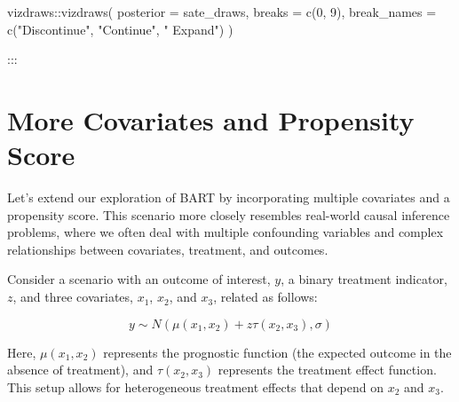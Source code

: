 \documentclass[
  letterpaper,
  DIV=11,
  numbers=noendperiod]{scrreprt}
\newenvironment{Shaded}{\begin{snugshade}}{\end{snugshade}}
\newcommand{\AttributeTok}[1]{\textcolor[rgb]{0.40,0.45,0.13}{#1}}
\newcommand{\DecValTok}[1]{\textcolor[rgb]{0.68,0.00,0.00}{#1}}
\newcommand{\FunctionTok}[1]{\textcolor[rgb]{0.28,0.35,0.67}{#1}}
\newcommand{\NormalTok}[1]{\textcolor[rgb]{0.00,0.23,0.31}{#1}}
\newcommand{\SpecialCharTok}[1]{\textcolor[rgb]{0.37,0.37,0.37}{#1}}
\newcommand{\StringTok}[1]{\textcolor[rgb]{0.13,0.47,0.30}{#1}}
\begin{document}
\begin{Shaded}
\begin{Highlighting}[]
\NormalTok{vizdraws}\SpecialCharTok{::}\FunctionTok{vizdraws}\NormalTok{(}
  \AttributeTok{posterior =}\NormalTok{ sate\_draws,}
  \AttributeTok{breaks =} \FunctionTok{c}\NormalTok{(}\DecValTok{0}\NormalTok{, }\DecValTok{9}\NormalTok{),}
  \AttributeTok{break\_names =} \FunctionTok{c}\NormalTok{(}\StringTok{"Discontinue"}\NormalTok{, }\StringTok{"Continue"}\NormalTok{, }\StringTok{" Expand"}\NormalTok{)}
\NormalTok{)}
\end{Highlighting}
\end{Shaded}

:::

\section{More Covariates and Propensity
Score}\label{more-covariates-and-propensity-score}

Let's extend our exploration of BART by incorporating multiple
covariates and a propensity score. This scenario more closely resembles
real-world causal inference problems, where we often deal with multiple
confounding variables and complex relationships between covariates,
treatment, and outcomes.

Consider a scenario with an outcome of interest, \(y\), a binary
treatment indicator, \(z\), and three covariates, \(x_1\), \(x_2\), and
\(x_3\), related as follows:

\[
y \sim N(\mu(x_1,x_2) + z \tau(x_2,x_3), \sigma)
\]

Here, \(\mu(x_1,x_2)\) represents the prognostic function (the expected
outcome in the absence of treatment), and \(\tau(x_2,x_3)\) represents
the treatment effect function. This setup allows for heterogeneous
treatment effects that depend on \(x_2\) and \(x_3\).
\end{document}
